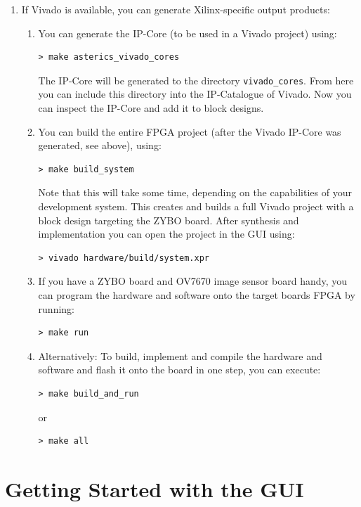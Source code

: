 \begin{enumerate}
\item If Vivado is available, you can generate Xilinx-specific output products:
	{
    \begin{enumerate}
	\item You can generate the \asterics IP-Core (to be used in a Vivado project) using:
    \begin{lstlisting}[style=Shell]
 > make asterics_vivado_cores
    \end{lstlisting}
    The IP-Core will be generated to the directory \texttt{vivado\_cores}.
    From here you can include this directory into the IP-Catalogue of Vivado.
    Now you can inspect the IP-Core and add it to block designs.
  \item You can build the entire FPGA project (after the Vivado IP-Core was generated, see above), using:
    \begin{lstlisting}[style=Shell]
 > make build_system
    \end{lstlisting}
  Note that this will take some time, depending on the capabilities of your development system.
  This creates and builds a full Vivado project with a block design targeting the ZYBO board.
  After synthesis and implementation you can open the project in the GUI using:
  \begin{lstlisting}[style=Shell]
 > vivado hardware/build/system.xpr
  \end{lstlisting}
  \item If you have a ZYBO board and OV7670 image sensor board handy, you can program the hardware and software onto the target boards FPGA by running:
    \begin{lstlisting}[style=Shell]
 > make run
    \end{lstlisting}
  \item Alternatively: To build, implement and compile the hardware and software and flash it onto the board in one step, you can execute:
    \begin{lstlisting}[style=Shell]
 > make build_and_run
    \end{lstlisting}
  or
    \begin{lstlisting}[style=Shell]
 > make all
    \end{lstlisting}
	\end{enumerate}
	}
\end{enumerate}


\section{Getting Started with the \asterics GUI}

